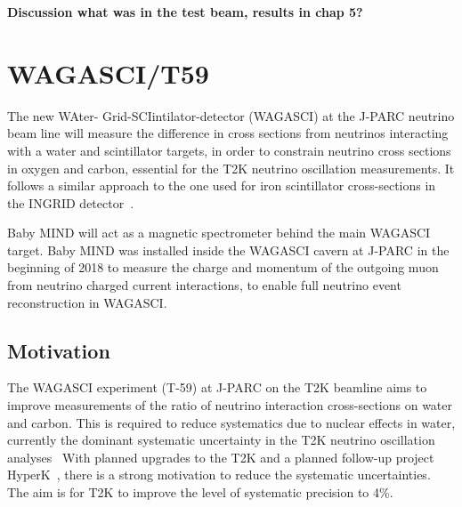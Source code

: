 \textbf{Discussion what was in the test beam, results in chap 5?}

\newpage
\clearpage

\section{WAGASCI/T59}\label{sec:WAGASCI}

The new WAter- Grid-SCIintilator-detector (WAGASCI) at the J-PARC neutrino beam line will measure the difference in cross sections from neutrinos interacting with a water and scintillator targets, in order to constrain neutrino cross sections in oxygen and carbon, essential for the T2K neutrino oscillation measurements. It follows a similar approach to the one used for iron scintillator cross-sections in the INGRID detector~\cite{21T2K}.

Baby MIND will act as a magnetic spectrometer behind the main WAGASCI target. Baby MIND was installed inside the WAGASCI cavern at J-PARC in the beginning of 2018 to measure the charge and momentum of the outgoing muon from neutrino charged current interactions, to enable full neutrino event reconstruction in WAGASCI.

\subsection{Motivation}
The WAGASCI experiment (T-59) at J-PARC on the T2K beamline aims to improve measurements of the ratio of neutrino interaction cross-sections on water and carbon. This is required to reduce systematics due to nuclear effects in water, currently the dominant systematic uncertainty in the T2K neutrino oscillation analyses~\cite{21T2K} With planned upgrades to the T2K and a planned follow-up project HyperK~\cite{24HyperK}, there is a strong motivation to reduce the systematic uncertainties. The aim is for T2K to improve the level of systematic precision to 4\%. 


